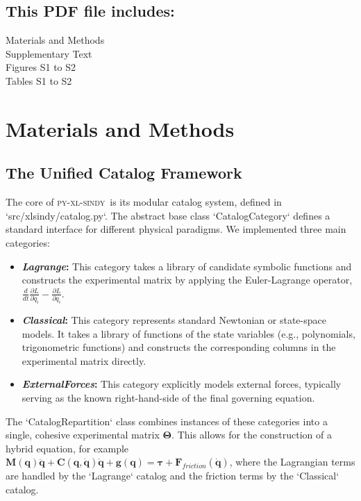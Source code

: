 \documentclass[12pt]{article}
\newcommand{\frameworkname}{\textsc{py-xl-sindy}}
\newcommand{\lagrangecat}{\textit{Lagrange}}
\newcommand{\classicalcat}{\textit{Classical}}
\newcommand{\forcescat}{\textit{ExternalForces}}
\begin{document}
\subsection*{This PDF file includes:}
Materials and Methods\\
Supplementary Text\\
Figures S1 to S2\\
Tables S1 to S2

\newpage


\section*{Materials and Methods}

\subsection*{The Unified Catalog Framework}
The core of \frameworkname\ is its modular catalog system, defined in `src/xlsindy/catalog.py`. The abstract base class `CatalogCategory` defines a standard interface for different physical paradigms. We implemented three main categories:
\begin{itemize}
    \item \textbf{\lagrangecat:} This category takes a library of candidate symbolic functions and constructs the experimental matrix by applying the Euler-Lagrange operator, $\frac{d}{dt}\frac{\partial L}{\partial \dot{q}_i} - \frac{\partial L}{\partial q_i}$.
    \item \textbf{\classicalcat:} This category represents standard Newtonian or state-space models. It takes a library of functions of the state variables (e.g., polynomials, trigonometric functions) and constructs the corresponding columns in the experimental matrix directly.
    \item \textbf{\forcescat:} This category explicitly models external forces, typically serving as the known right-hand-side of the final governing equation.
\end{itemize}
The `CatalogRepartition` class combines instances of these categories into a single, cohesive experimental matrix $\mathbf{\Theta}$. This allows for the construction of a hybrid equation, for example $\mathbf{M}(\mathbf{q})\ddot{\mathbf{q}} + \mathbf{C}(\mathbf{q},\dot{\mathbf{q}})\dot{\mathbf{q}} + \mathbf{g}(\mathbf{q}) = \mathbf{\tau} + \mathbf{F}_{friction}(\dot{\mathbf{q}})$, where the Lagrangian terms are handled by the `Lagrange` catalog and the friction terms by the `Classical` catalog.
\end{document}
